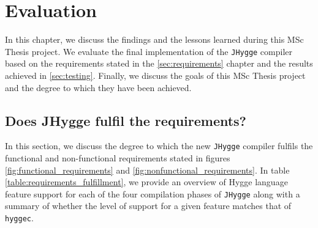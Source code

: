 \chapter{Evaluation}

In this chapter, we discuss the findings and the lessons learned during this MSc Thesis project. We evaluate the final implementation
of the \texttt{JHygge} compiler based on the requirements stated in the \ref{sec:requirements} chapter and the results achieved in
\ref{sec:testing}. Finally, we discuss the goals of this MSc Thesis project and the degree to which they have been achieved.

\section{Does JHygge fulfil the requirements?}

In this section, we discuss the degree to which the new \texttt{JHygge} compiler fulfils the functional and non-functional requirements
stated in figures \ref{fig:functional_requirements} and \ref{fig:nonfunctional_requirements}. In table \ref{table:requirements_fulfillment}, we provide an overview of Hygge language feature support for each of the four compilation phases of
\texttt{JHygge} along with a summary of whether the level of support for a given feature matches that of \texttt{hyggec}.

